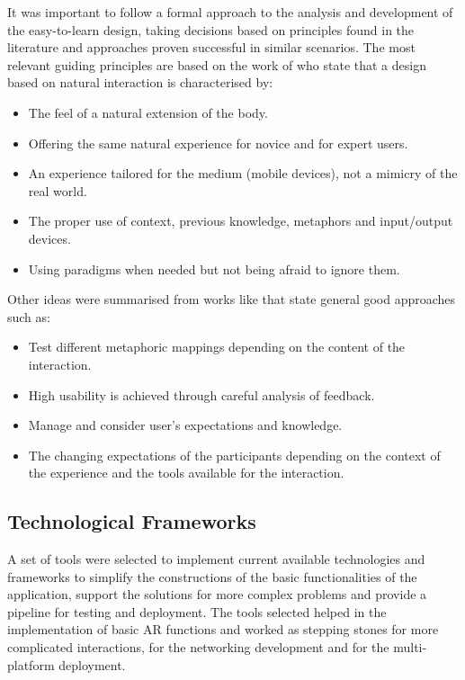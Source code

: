 It was important to follow a formal approach to the analysis and development of the easy-to-learn design, taking decisions based on principles found in the literature and
approaches proven successful in similar scenarios. The most relevant guiding principles are based on the work of \textcite{wigdor_2011} who state that a design based on
natural interaction is characterised by:

\begin{itemize}
    \item The feel of a natural extension of the body.
    \item Offering the same natural experience for novice and for expert users.
    \item An experience tailored for the medium (mobile devices), not a mimicry of the real world.
    \item The proper use of context, previous knowledge, metaphors and input/output devices.
    \item Using paradigms when needed but not being afraid to ignore them.
\end{itemize}

Other ideas were summarised from works like \textcite{macaranas_2015,strijbos_2004,good_1984} that state general good approaches such as:

\begin{itemize}
    \item Test different metaphoric mappings depending on the content of the interaction.
    \item High usability is achieved through careful analysis of feedback.
    \item Manage and consider user's expectations and knowledge.
    \item The changing expectations of the participants depending on the context of the experience and the tools available for the interaction.
\end{itemize}

\subsection{Technological Frameworks \label{sec:4-3-2}}

A set of tools were selected to implement current available technologies and frameworks to simplify the constructions of the basic functionalities of the application,
support the solutions for more complex problems and provide a pipeline for testing and deployment. The tools selected helped in the implementation of basic \ac{AR}
functions and worked as stepping stones for more complicated interactions, for the networking development and for the multi-platform deployment.

